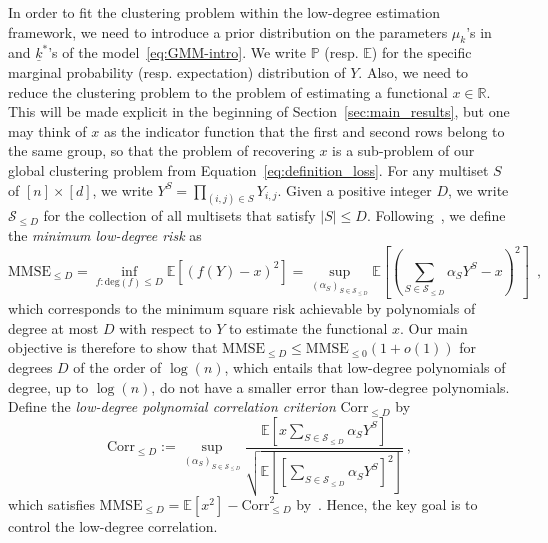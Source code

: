 \documentclass{article}
\begin{document}
In order to fit the clustering problem within the low-degree estimation framework, we need to introduce a prior distribution on the parameters $\mu_k$'s in and $\underline{k}^*$'s of the model~\eqref{eq:GMM-intro}. We write $\mathbb{P}$ (resp. $\mathbb{E}$) for the specific marginal probability (resp. expectation) distribution of $Y$. Also, we need to reduce the clustering problem to the problem of estimating a functional $x\in \mathbb{R}$. 
This will be made explicit in the beginning of Section~\ref{sec:main_results}, but one may think of $x$ as the indicator function that the first and second rows belong to the same group, so that the problem of recovering $x$ is a sub-problem of our global clustering problem from Equation~\ref{eq:definition_loss}. 
For any multiset $S$ of $[n] \times [d]$, we write $Y^S = \prod_{(i,j) \in S} Y_{i,j}$. Given a positive integer  $D$, we write $\mathcal S_{\leq D}$ for the collection of all multisets that satisfy $|S| \leq D$. 
Following~\cite{SchrammWein22}, we define the \emph{minimum low-degree risk} as
$$\mathrm{MMSE}_{\leq D} = \inf_{f: \mathrm{deg}(f)\leq D}\mathbb{E}[(f(Y)-x)^2] = \sup_{(\alpha_S)_{S \in \mathcal S_{\leq D}}} \mathbb E\left[ \left(\sum_{S \in \mathcal S_{\leq D}} \alpha_S Y^S - x\right)^2\right]\enspace ,$$
which corresponds to the minimum square risk achievable by polynomials of degree at most $D$ with respect to $Y$ to estimate the functional $x$.  Our main objective is therefore to show that $\mathrm{MMSE}_{\leq D}\leq \mathrm{MMSE}_{\leq 0} (1+o(1))$ for degrees $D$ of the order of $\log(n)$, which entails that low-degree polynomials of degree, up to $\log(n)$, do not have a smaller error than low-degree polynomials. 
Define the \emph{low-degree polynomial correlation criterion} $\mathrm{Corr}_{\leq D}$ by
\begin{equation}\label{eq:ld_correlation}
\mathrm{Corr}_{\leq D} := \sup_{(\alpha_S)_{S \in \mathcal S_{\leq D}}} \frac{\mathbb E\left[ x\sum_{S \in \mathcal S_{\leq D}} \alpha_S Y^S\right]}{\sqrt{\mathbb E\left[\left[\sum_{S \in \mathcal S_{\leq D}} \alpha_S Y^S\right]^2\right]}}\ , 
\end{equation}
which satisfies $\mathrm{MMSE}_{\leq D}=\mathbb{E}[x^2]- \mathrm{Corr}^2_{\leq D}$ by~\cite{SchrammWein22}. Hence, the key goal is to control the low-degree correlation. 
\end{document}
